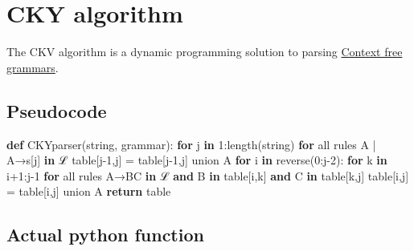 \documentclass[
  11pt,
  british,
]{article}
\newenvironment{Shaded}{}{}
\newcommand{\BuiltInTok}[1]{#1}
\newcommand{\ControlFlowTok}[1]{\textcolor[rgb]{0.00,0.44,0.13}{\textbf{#1}}}
\newcommand{\DecValTok}[1]{\textcolor[rgb]{0.25,0.63,0.44}{#1}}
\newcommand{\KeywordTok}[1]{\textcolor[rgb]{0.00,0.44,0.13}{\textbf{#1}}}
\newcommand{\NormalTok}[1]{#1}
\newcommand{\OperatorTok}[1]{\textcolor[rgb]{0.40,0.40,0.40}{#1}}
\begin{document}
\hypertarget{cky-algorithm}{%
\section{CKY algorithm}\label{cky-algorithm}}

The CKV algorithm is a dynamic programming solution to parsing
\href{Context\%20free\%20grammars.md}{Context free grammars}.

\hypertarget{pseudocode}{%
\subsection{Pseudocode}\label{pseudocode}}

\begin{Shaded}
\begin{Highlighting}[]
\KeywordTok{def}\NormalTok{ CKYparser(string, grammar):}
    \ControlFlowTok{for}\NormalTok{ j }\KeywordTok{in} \DecValTok{1}\NormalTok{:length(string)  }
        \ControlFlowTok{for} \BuiltInTok{all}\NormalTok{ rules A }\OperatorTok{|}\NormalTok{ A→s[j] }\KeywordTok{in}\NormalTok{ ℒ  }
\NormalTok{            table[j}\OperatorTok{{-}}\DecValTok{1}\NormalTok{,j] }\OperatorTok{=}\NormalTok{ table[j}\OperatorTok{{-}}\DecValTok{1}\NormalTok{,j] union A  }
        \ControlFlowTok{for}\NormalTok{ i }\KeywordTok{in}\NormalTok{ reverse(}\DecValTok{0}\NormalTok{:j}\OperatorTok{{-}}\DecValTok{2}\NormalTok{):  }
            \ControlFlowTok{for}\NormalTok{ k }\KeywordTok{in}\NormalTok{ i}\OperatorTok{+}\DecValTok{1}\NormalTok{:j}\OperatorTok{{-}}\DecValTok{1}  
                \ControlFlowTok{for} \BuiltInTok{all}\NormalTok{ rules A→BC }\KeywordTok{in}\NormalTok{ ℒ }\KeywordTok{and}\NormalTok{ B }\KeywordTok{in}\NormalTok{ table[i,k] }\KeywordTok{and}\NormalTok{ C }\KeywordTok{in}\NormalTok{ table[k,j]  }
\NormalTok{                    table[i,j] }\OperatorTok{=}\NormalTok{ table[i,j] union A  }
    \ControlFlowTok{return}\NormalTok{ table}
\end{Highlighting}
\end{Shaded}

\hypertarget{actual-python-function}{%
\subsection{Actual python function}\label{actual-python-function}}
\end{document}
